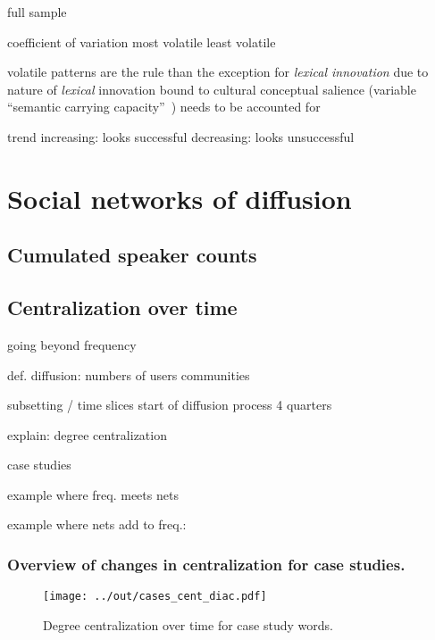 \documentclass[a4paper, abstract=on]{scrartcl}
\begin{document}
    full sample

      coefficient of variation
        most volatile
        least volatile

      volatile patterns are the rule than the exception for \emph{lexical innovation}
        due to nature of \emph{lexical} innovation
          bound to cultural conceptual salience (variable \enquote{semantic carrying capacity}~\parencite{Nini2017})
        needs to be accounted for

        trend
          increasing: looks successful
          decreasing: looks unsuccessful

\section{Social networks of diffusion}

  \subsection{Cumulated speaker counts}

  \subsection{Centralization over time}

    going beyond frequency

    def. diffusion:
      numbers of users
      communities

    subsetting / time slices
      start of diffusion process
      4 quarters

    explain: degree centralization

    case studies

      example where freq. meets nets

      example where nets add to freq.: 

      \subsubsection{Overview of changes in centralization for case studies.}

        \begin{figure}[H]
          \caption{Degree centralization over time for case study words.}
          \centering
          \texttt{[image: ../out/cases\_cent\_diac.pdf]}
        \end{figure}
\end{document}
